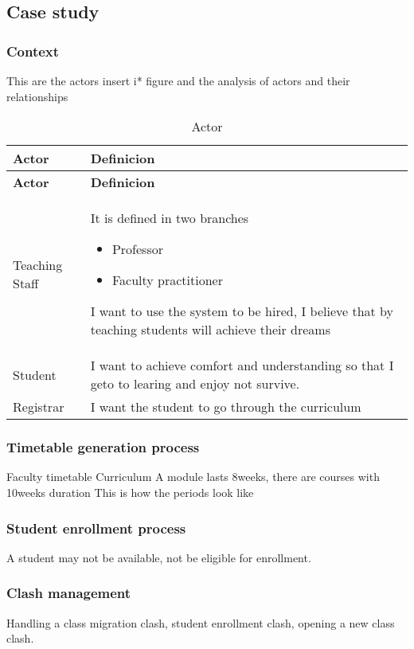 \subsection{Case study}
\subsubsection{Context}
This are the actors
insert i* figure and the analysis of actors and their relationships


\begin{longtable}{p{3in}|p{3in}}
\caption{Actor} \label{tab:objectivesNactions} \\
\hline
\textbf{Actor} & \textbf{Definicion} \\
\hline
\endfirsthead
\hline
\textbf{Actor} & \textbf{Definicion} \\
\hline
\endhead
\hline
\endfoot

Teaching Staff &

It is defined in two branches
\begin{itemize}
	\item Professor
	\item Faculty practitioner
\end{itemize}
I want to use the system to be hired, I believe that by teaching students will achieve their dreams
\\\hline

Student &
I want to achieve comfort and understanding so that I geto to learing and enjoy not survive.
\\\hline

Registrar &
I want the student to go through the curriculum




\end{longtable}

\subsubsection{Timetable generation process}
Faculty timetable
Curriculum
A module lasts 8weeks, there are courses with 10weeks duration
This is how the periods look like
\subsubsection{Student enrollment process}
A student may not be available, not be eligible for enrollment.
\subsubsection{Clash management}
Handling a class migration clash, student enrollment clash, opening a new class clash.
